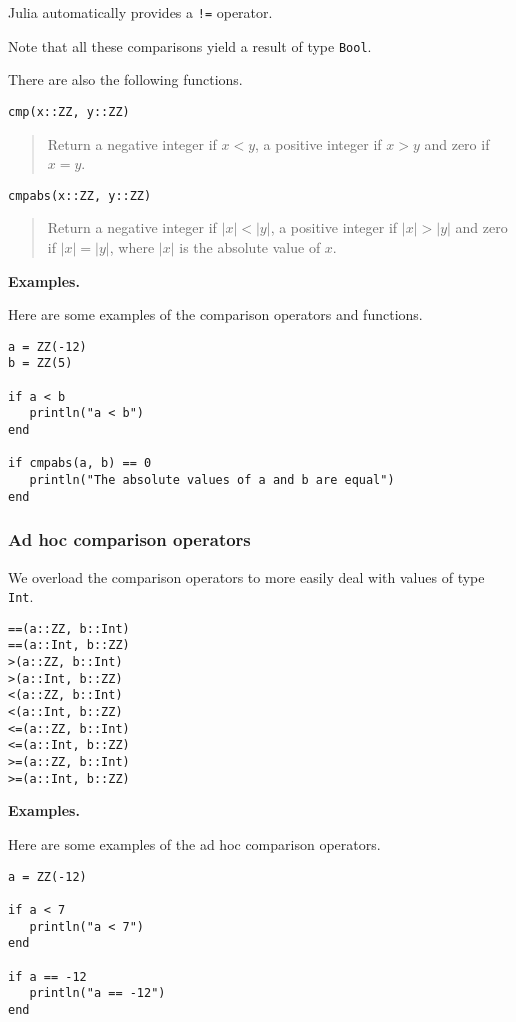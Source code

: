 \documentclass[a4paper,10pt]{article}
\newcommand{\code}{\lstinline}
\newcommand{\desc}[1]{\vspace{-3mm}\begin{quote}#1\end{quote}}
\begin{document}
{{{Julia automatically provides a \code{!=} operator.

Note that all these comparisons yield a result of type \code{Bool}.

There are also the following functions.

\begin{lstlisting}
cmp(x::ZZ, y::ZZ)
\end{lstlisting}

\desc{Return a negative integer if $x < y$, a positive integer if $x > y$ and zero if $x = y$.}

\begin{lstlisting}
cmpabs(x::ZZ, y::ZZ)
\end{lstlisting}

\desc{Return a negative integer if $|x| < |y|$, a positive integer if $|x| > |y|$ and zero if 
$|x| = |y|$, where $|x|$ is the absolute value of $x$.}

\textbf{Examples.}

Here are some examples of the comparison operators and functions.

\begin{lstlisting}
a = ZZ(-12)
b = ZZ(5)

if a < b
   println("a < b")
end

if cmpabs(a, b) == 0
   println("The absolute values of a and b are equal")
end
\end{lstlisting}

\subsubsection{Ad hoc comparison operators}

We overload the comparison operators to more easily deal with values of type \code{Int}.

\begin{lstlisting}
==(a::ZZ, b::Int)
==(a::Int, b::ZZ)
>(a::ZZ, b::Int)
>(a::Int, b::ZZ)
<(a::ZZ, b::Int)
<(a::Int, b::ZZ)
<=(a::ZZ, b::Int)
<=(a::Int, b::ZZ)
>=(a::ZZ, b::Int)
>=(a::Int, b::ZZ)
\end{lstlisting}

\textbf{Examples.}

Here are some examples of the ad hoc comparison operators.

\begin{lstlisting}
a = ZZ(-12)

if a < 7
   println("a < 7")
end

if a == -12
   println("a == -12")
end
\end{lstlisting}

}}}
\end{document}

